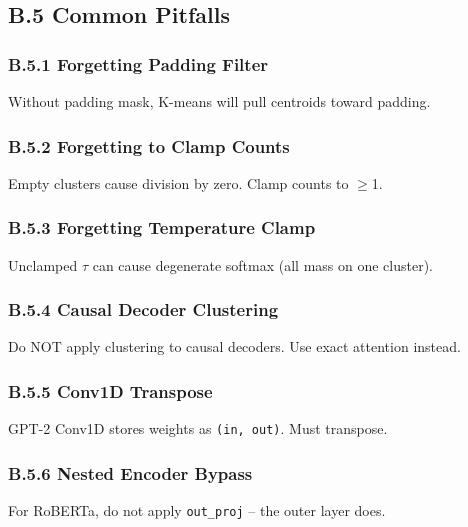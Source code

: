\subsection{B.5 Common Pitfalls}

\subsubsection{B.5.1 Forgetting Padding Filter}

Without padding mask, K-means will pull centroids toward padding.

\subsubsection{B.5.2 Forgetting to Clamp Counts}

Empty clusters cause division by zero. Clamp counts to $\ge$1.

\subsubsection{B.5.3 Forgetting Temperature Clamp}

Unclamped $\tau$ can cause degenerate softmax (all mass on one cluster).

\subsubsection{B.5.4 Causal Decoder Clustering}

Do NOT apply clustering to causal decoders. Use exact attention instead.

\subsubsection{B.5.5 Conv1D Transpose}

GPT-2 Conv1D stores weights as \texttt{(in, out)}. Must transpose.

\subsubsection{B.5.6 Nested Encoder Bypass}

For RoBERTa, do not apply \texttt{out\_proj} -- the outer layer does.